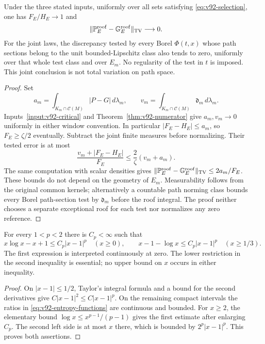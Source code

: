 \begin{theorem}
\label{thm:v92-moving}
Under the three stated inputs, uniformly over all sets satisfying
\eqref{eq:v92-selection}, one has $F_E/H_E\to1$ and
\begin{equation}\label{eq:v92-roof-tv}
 \|\mathbb P_E^{\rm roof}-\mathbb G_E^{\rm roof}\|_{\TV}
                                                        \longrightarrow0.
\end{equation}
For the joint laws, the discrepancy tested by every Borel $\Phi(t,x)$
whose path sections belong to the unit bounded-Lipschitz class also
tends to zero, uniformly over that whole test class and over $E_m$.
No regularity of the test in $t$ is imposed. This joint conclusion is
not total variation on path space.
\end{theorem}
\begin{proof}
Set
\[
 a_m=\int_{K_m\cap\mathcal C(M)}|P-G|\,d\lambda_m,
 \qquad v_m=\int_{K_m\cap\mathcal C(M)}\mathfrak d_m\,d\lambda_m.
\]
Inputs~\ref{input:v92-critical} and Theorem~\ref{thm:v92-numerator}
give $a_m,v_m\to0$ uniformly in either window convention. In
particular $|F_E-H_E|\le a_m$, so $F_E\ge\zeta/2$ eventually.
Subtract the joint finite measures before normalizing. Their tested
error is at most
\begin{equation}\label{eq:v92-joint-bound}
 \frac{v_m+|F_E-H_E|}{F_E}
                         \le\frac2\zeta(v_m+a_m).
\end{equation}
The same computation with scalar densities gives
$\|\mathbb P_E^{\rm roof}-\mathbb G_E^{\rm roof}\|_{\operatorname{TV}}
\le2a_m/F_E$. These bounds do not depend on the geometry of $E_m$.
Measurability follows from the original common kernels; alternatively
a countable path norming class bounds every Borel path-section test by
$\mathfrak d_m$ before the roof integral. The proof neither chooses a
separate exceptional roof for each test nor normalizes any zero reference.
\end{proof}

\begin{lemma}
\label{lem:v92-entropy}
For every $1<p<2$ there is $C_p<\infty$ such that
\begin{equation}\label{eq:v92-entropy-functions}
 x\log x-x+1\le C_p|x-1|^p\quad(x\ge0),\qquad
 x-1-\log x\le C_p|x-1|^p\quad(x\ge1/3).
\end{equation}
The first expression is interpreted continuously at zero. The lower
restriction in the second inequality is essential; no upper bound on
$x$ occurs in either inequality.
\end{lemma}
\begin{proof}
On $|x-1|\le1/2$, Taylor's integral formula and a bound for the
second derivatives give $C|x-1|^2\le C|x-1|^p$. On the remaining
compact intervals the ratios in \eqref{eq:v92-entropy-functions}
are continuous and bounded. For $x\ge2$, the elementary bound
$\log x\le x^{p-1}/(p-1)$ gives the first estimate after enlarging
$C_p$. The second left side is at most $x$ there, which is bounded
by $2^p|x-1|^p$. This proves both assertions.
\end{proof}

